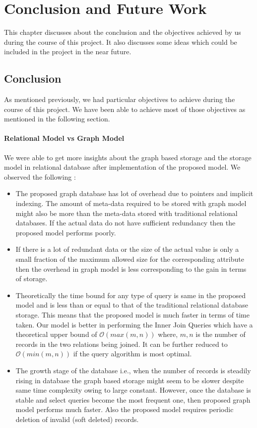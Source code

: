 \documentclass[12pt, oneside]{book}
\begin{document}
\chapter{Conclusion and Future Work}
This chapter discusses about the conclusion and the objectives achieved by us during the course of this project. It also discusses some ideas which could be included in the project in the near future.   
\section{Conclusion}
As mentioned previously, we had particular objectives to achieve during the course of this project. We have been able to achieve most of those objectives as mentioned in the following section.
\subsubsection{Relational Model vs Graph Model}
We were able to get more insights about the graph based storage and the storage model in relational database after implementation of the proposed model. We observed the following :
\begin{itemize}
 \item The proposed graph database has lot of overhead due to pointers and implicit indexing. The amount of meta-data required to be stored with graph model might also be more than the meta-data stored with traditional relational databases. If the actual data do not have sufficient redundancy then the proposed model performs poorly.
 \item If there is a lot of redundant data or the size of the actual value is only a small fraction of the maximum allowed size for the corresponding attribute then the overhead in graph model is less corresponding to the gain in terms of storage.
 \item Theoretically the time bound for any type of query is same in the proposed model and is less than or equal to that of the traditional relational database storage. This means that the proposed model is much faster in terms of time taken. Our model is better in performing the Inner Join Queries which have a theoretical upper bound of $\mathcal{O}(max(m, n))$ where, $m, n$ is the number of records in the two relations being joined. It can be further reduced to $\mathcal{O}(min(m,n))$ if the query algorithm is most optimal.
 \item The growth stage of the database i.e., when the number of records is steadily rising in database the graph based storage might seem to be slower despite same time complexity owing to large constant. However, once the database is stable and select queries become the most frequent one, then proposed graph model performs much faster. Also the proposed model requires periodic deletion of invalid (soft deleted) records.
\end{itemize}
\end{document}
